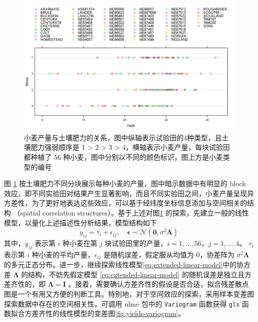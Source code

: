 \documentclass[12pt,a4paper,UTF8,twoside]{book}
\theoremstyle{definition}
\theoremstyle{definition}
\theoremstyle{definition}
\theoremstyle{remark}
\begin{document}
\begin{figure}

{\centering \includegraphics[width=0.7\linewidth]{figures/Yields-Block} 

}

\caption{小麦产量与土壤肥力的关系，图中纵轴表示试验田的4种类型，且土壤肥力强弱顺序是 1 > 2 > 3 > 4，横轴表示小麦产量，每块试验田都种植了 56 种小麦，图中分别以不同的颜色标识，图上方是小麦类型的编号}\label{fig:yields-block}
\end{figure}

图 \ref{fig:yields-block}
按土壤肥力不同分块展示每种小麦的产量，图中暗示数据中有明显的 block
效应，即不同实验田对结果产生显著影响，而且不同实验田之间，小麦产量呈现异方差性，为了更好地表达这些效应，可以基于经纬度坐标信息添加与空间相关的结构
（spatial correlation structures）。基于上述对图\ref{fig:yields-block}
的探索，先建立一般的线性模型，以量化上述描述性分析结果，模型结构如下
\begin{equation}
y_{ij} = \tau_i + \epsilon_{ij}, \quad \boldsymbol{\epsilon} \sim \mathcal{N}(\mathbf{0},\sigma^2 \boldsymbol{\Lambda}) \label{eq:extended-linear-model}
\end{equation} \noindent 其中，\(y_{ij}\) 表示第 \(i\) 种小麦在第 \(j\)
块试验田里的产量，\(i = 1,\ldots,56\)，\(j = 1,\ldots,4\)。 \(\tau_i\)
表示第 \(i\) 种小麦的平均产量，\(\epsilon_{ij}\)
是随机误差，假定服从均值为 0，协差阵为 \(\sigma^2 \boldsymbol{\Lambda}\)
的多元正态分布。进一步，继续探索线性模型\eqref{eq:extended-linear-model}中的协方差
\(\boldsymbol{\Lambda}\) 的结构，不妨先假定模型
\eqref{eq:extended-linear-model} 的随机误差是独立且方差齐性的，即
\(\boldsymbol{\Lambda} = \boldsymbol{I}\)
。接着，需要确认方差齐性的假设是否合适，拟合残差散点图是一个有用又方便的判断工具。特别地，对于空间效应的探索，采用样本变差图探索数据中存在的空间相关性，可调用
nlme 包中的 \texttt{Variogram} 函数获得 \texttt{gls}
函数拟合方差齐性的线性模型的变差图\ref{fig:yields-variogram}。
\end{document}
